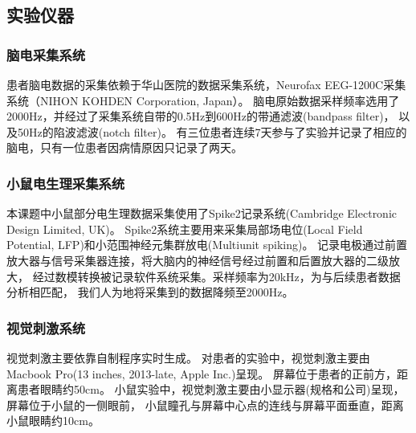 \subsection{实验仪器}

\subsubsection{脑电采集系统}
患者脑电数据的采集依赖于华山医院的数据采集系统，Neurofax EEG-1200C采集系统（NIHON KOHDEN Corporation, Japan）。
脑电原始数据采样频率选用了2000Hz，并经过了采集系统自带的0.5Hz到600Hz的带通滤波(bandpass filter)，
以及50Hz的陷波滤波(notch filter)。
有三位患者连续7天参与了实验并记录了相应的脑电，只有一位患者因病情原因只记录了两天。

\subsubsection{小鼠电生理采集系统}
本课题中小鼠部分电生理数据采集使用了Spike2记录系统(Cambridge Electronic Design Limited, UK)。
Spike2系统主要用来采集局部场电位(Local Field Potential, LFP)和小范围神经元集群放电(Multiunit spiking)。
记录电极通过前置放大器与信号采集器连接，将大脑内的神经信号经过前置和后置放大器的二级放大，
经过数模转换被记录软件系统采集。采样频率为20kHz，为与后续患者数据分析相匹配，
我们人为地将采集到的数据降频至2000Hz。%

\subsubsection{视觉刺激系统}
视觉刺激主要依靠自制程序实时生成。
对患者的实验中，视觉刺激主要由Macbook Pro(13 inches, 2013-late, Apple Inc.)呈现。
屏幕位于患者的正前方，距离患者眼睛约50cm。
小鼠实验中，视觉刺激主要由小显示器(规格和公司)呈现，屏幕位于小鼠的一侧眼前，%
小鼠瞳孔与屏幕中心点的连线与屏幕平面垂直，距离小鼠眼睛约10cm。
